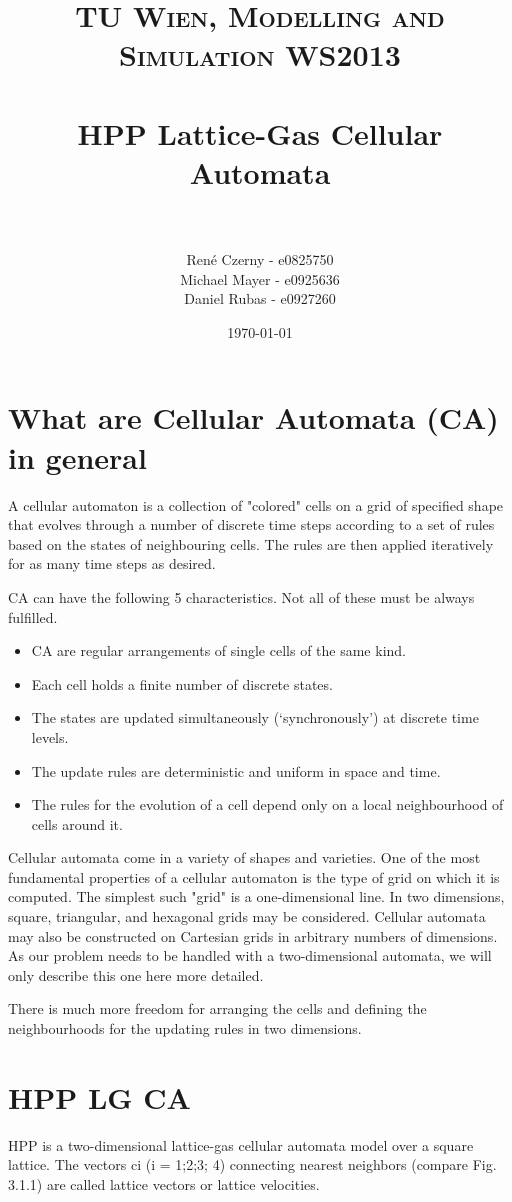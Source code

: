 \documentclass[paper=a4, fontsize=11pt]{scrartcl} %
\title{	
\normalfont \normalsize 
\textsc{TU Wien, Modelling and Simulation WS2013} \\ [25pt] %
\horrule{0.5pt} \\[0.4cm] %
\huge HPP Lattice-Gas Cellular Automata \\ %
\horrule{2pt} \\[0.5cm] %
}
\author{René Czerny - e0825750\\Michael Mayer - e0925636\\Daniel Rubas - e0927260}
\date{\normalsize\today} %
\numberwithin{equation}{section} %
\numberwithin{figure}{section} %
\numberwithin{table}{section} %
\begin{document}
\maketitle %

\section{What are Cellular Automata (CA) in general}

A cellular automaton is a collection of "colored" cells on a grid of specified shape that evolves through a number of discrete time steps according to a set of rules based on the states of neighbouring cells. The rules are then applied iteratively for as many time steps as desired.

CA  can have the following 5 characteristics. Not all of these must be always fulfilled. 

\begin{itemize}
	\item CA are regular arrangements of single cells of the same kind.
	\item Each cell holds a finite number of discrete states.
	\item The states are updated simultaneously (`synchronously') at discrete time levels.
	\item The update rules are deterministic and uniform in space and time.
	\item The rules for the evolution of a cell depend only on a local neighbourhood of cells around it. 
\end{itemize}

Cellular automata come in a variety of shapes and varieties. One of the most fundamental properties of a cellular automaton is the type of grid on which it is computed. The simplest such "grid" is a one-dimensional line. In two dimensions, square, triangular, and hexagonal grids may be considered. Cellular automata may also be constructed on Cartesian grids in arbitrary numbers of dimensions. 
As our problem needs to be handled with a two-dimensional automata, we will only describe this one here more detailed. 

There is much more freedom for arranging the cells and defining the neighbourhoods for the updating rules in two dimensions.


\section{HPP LG CA}
HPP is a two-dimensional lattice-gas cellular automata model over a square
lattice. The vectors ci (i = 1;2;3; 4) connecting nearest neighbors (compare
Fig. 3.1.1) are called lattice vectors or lattice velocities.
\end{document}
